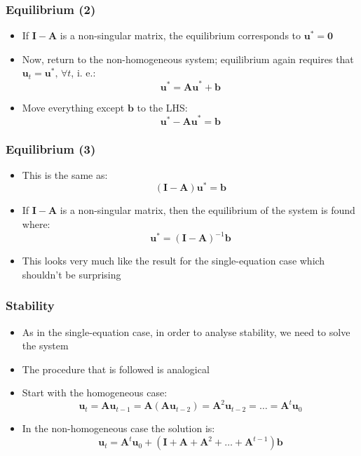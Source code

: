 \documentclass[10pt,usenames,dvipsnames]{beamer}
\theoremstyle{plain}
\theoremstyle{definition}
\begin{document}
\begin{frame}[fragile]
\frametitle{Equilibrium (2)}
\begin{itemize}
	\item If $\mathbf{I-A}$ is a non-singular matrix, the equilibrium corresponds to  $\mathbf{u}^{*} = \mathbf{0}$
	\item Now, return to the non-homogeneous system; equilibrium again requires that $\mathbf{u}_{t} = \mathbf{u}^{*},\, \forall t$, i. e.:
	\[
		\mathbf{u}^{*} = \mathbf{Au}^{*} + \mathbf{b}
	\]
	\item Move everything except $\mathbf{b}$ to the LHS:
	\[
		\mathbf{u}^{*} - \mathbf{Au}^{*} = \mathbf{b}
	\]
\end{itemize}
\end{frame}

\begin{frame}[fragile]
\frametitle{Equilibrium (3)}
\begin{itemize}
	\item This is the same as:
	\[
		(\mathbf{I-A})\mathbf{u}^{*} = \mathbf{b}
	\]
	\item If $\mathbf{I-A}$ is a non-singular matrix, then the equilibrium of the system is found where:
	\[
		\mathbf{u}^{*} = (\mathbf{I-A})^{-1}\mathbf{b}
	\]
	\item This looks very much like the result for the single-equation case which shouldn't be surprising
\end{itemize}
\end{frame}

\begin{frame}[fragile]
\frametitle{Stability}
\begin{itemize}
	\item As in the single-equation case, in order to analyse stability, we need to solve the system
	\item The procedure that is followed is analogical
	\item Start with the homogeneous case:
	\[
		\mathbf{u}_{t} = \mathbf{Au}_{t-1} = \mathbf{A}(\mathbf{Au}_{t-2}) = \mathbf{A}^{2}\mathbf{u}_{t-2} = \ldots = \mathbf{A}^{t}\mathbf{u}_{0}
	\]
	\item In the non-homogeneous case the solution is:
	\[
		\mathbf{u}_{t} = \mathbf{A}^{t}\mathbf{u}_{0} + (\mathbf{I + A} + \mathbf{A}^{2} + \ldots + \mathbf{A}^{t-1})\mathbf{b}
	\]
\end{itemize}
\end{frame}
\end{document}
